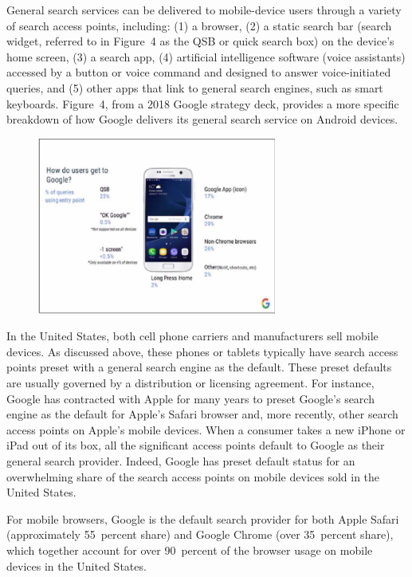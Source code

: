 \documentclass[11pt,b5paper,headings=small]{scrartcl}
\begin{document}
General search services can be delivered to mobile-device users through a variety
of search access points, including: (1) a browser, (2) a static search bar (search widget, referred
to in Figure~4 as the QSB or quick search box) on the device’s home screen, (3) a search app,
(4) artificial intelligence software (voice assistants) accessed by a button or voice command and
designed to answer voice-initiated queries, and (5) other apps that link to general search engines,
such as smart keyboards. Figure~4, from a 2018 Google strategy deck, provides a more specific
breakdown of how Google delivers its general search service on Android devices.
\begin{figure}
\centering
\caption{}
\includegraphics[width=0.7\textwidth]{US-v-Google-Complaint-figures/fig4.png}
\end{figure}


In the United States, both cell phone carriers and manufacturers sell mobile
devices. As discussed above, these phones or tablets typically have search access points preset
with a general search engine as the default. These preset defaults are usually governed by a
distribution or licensing agreement. For instance, Google has contracted with Apple for many
years to preset Google’s search engine as the default for Apple’s Safari browser and, more
recently, other search access points on Apple’s mobile devices. When a consumer takes a new
iPhone or iPad out of its box, all the significant access points default to Google as their general
search provider. Indeed, Google has preset default status for an overwhelming share of the search
access points on mobile devices sold in the United States.


For mobile browsers, Google is the default search provider for both Apple Safari
(approximately 55~percent share) and Google Chrome (over 35~percent share), which together
account for over 90~percent of the browser usage on mobile devices in the United States.
\end{document}
